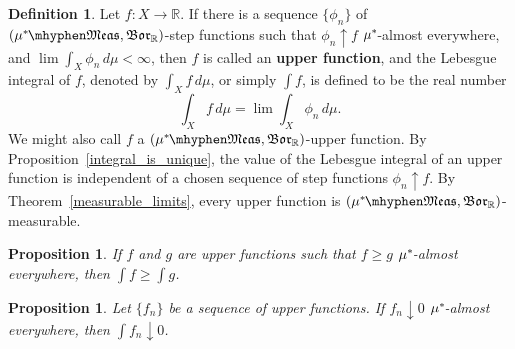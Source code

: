 \documentclass[
twoside=true,
paper=letter,
fontsize=11pt,
pagesize=auto,
leqno,
openany,
headsepline,
overfullrule,
]{scrbook}
\theoremstyle{plain}
\theoremstyle{plain}
\newtheorem{prop}[thm]{Proposition}
\theoremstyle{definition}
\newtheorem{defn}[thm]{Definition}
\theoremstyle{bfnoteitalic}
\theoremstyle{bfnoteroman}
\newcommand{\term}[1]{\textbf{#1}\index{#1}}
\newcommand{\borel}{\mathfrak{Bor}}
\newcommand{\R}{\mathbb{R}}
\newcommand{\measurable}[1]{{#1}\mhyphen\mathfrak{Meas}}
\newcommand{\kernast}{\ast\kern-1pt}
\newcommand{\mbmeasurable}{$(\measurable{\measure^\kernast},\borel_\R)$\hyp{}measurable}
\newcommand{\funcf}{f}
\newcommand{\measurespace}{X}
\newcommand{\measure}{\mu}
\begin{document}
\begin{defn}\label{upperfunction}
Let $f:\measurespace\to\R$.  If there is a sequence $\{\phi_n\}$ of $(\measurable{\measure^\kernast}, \borel_\R)$-step functions such that $\phi_n\uparrow f$ $\measure^\kernast$-almost everywhere, and $\lim \int_\measurespace\phi_n\,d\measure < \infty$, then $f$ is called an \term{upper function}, and the Lebesgue integral  of $f$, denoted by $\int_\measurespace f\, d\measure$, or simply $\int f$, is  defined to be the real number
\[
\int_\measurespace f\, d\measure
=
\lim \int_\measurespace\phi_n\,d\measure.
\]
We might also call $\funcf$ a
$(\measurable{\measure^\kernast}, \borel_\R)$-upper function.
By Proposition~\ref{integral_is_unique}, the value of the Lebesgue integral of an upper function is independent of a chosen sequence of step functions 
$\phi_n\uparrow f$.
By Theorem~\ref{measurable_limits}, every upper function is \mbmeasurable.
\end{defn}


\begin{prop}
If $f$ and $g$ are upper functions such that $f\geq g$ $\measure^\kernast$-almost everywhere, then 
$\int f \geq \int g$.
\end{prop}



\begin{prop}
Let $\{f_n\}$ be a sequence of upper functions.  If $f_n\downarrow 0$ $\measure^\kernast$-almost everywhere, then $\int f_n\downarrow 0$.
\end{prop}
\end{document}
